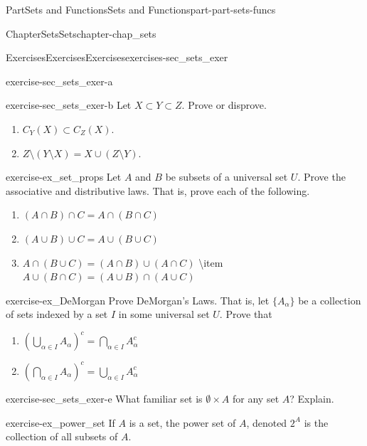 \documentclass[oneside,10pt,]{book}
\numberwithin{equation}{chapter}
\begin{document}
\begin{partptx}{Part}{Sets and Functions}{}{Sets and Functions}{}{}{part-part-sets-funcs}
\begin{chapterptx}{Chapter}{Sets}{}{Sets}{}{}{chapter-chap_sets}
\begin{exercises-section}{Exercises}{Exercises}{}{Exercises}{}{}{exercises-sec_sets_exer}
\begin{divisionexercise}{1}{}{}{exercise-sec_sets_exer-a}
\end{divisionexercise}%
\begin{divisionexercise}{2}{}{}{exercise-sec_sets_exer-b}%
Let \(X \subset Y \subset Z\). Prove or disprove.%
\begin{enumerate}[font=\bfseries,label=(\alph*),ref=\alph*]%
\item{}\(C_Y(X) \subset C_Z(X)\).%
\item{}\(Z \setminus (Y \setminus X) = X \cup (Z \setminus Y)\).%
\end{enumerate}%
\end{divisionexercise}%
\begin{divisionexercise}{3}{}{}{exercise-ex_set_props}%
Let \(A\) and \(B\) be subsets of a universal set \(U\). Prove the associative and distributive laws. That is, prove each of the following.%
\begin{enumerate}[font=\bfseries,label=(\alph*),ref=\alph*]%
\item{}\((A \cap B) \cap C = A \cap (B \cap C)\)%
\item{}\((A \cup B) \cup C = A \cup (B \cup C)\)%
\item{}\(A \cap (B \cup C) = (A \cap B) \cup (A \cap C)\) \textbackslash{}item\(A \cup (B \cap C) = (A \cup B) \cap (A \cup C)\)%
\end{enumerate}%
\end{divisionexercise}%
\begin{divisionexercise}{4}{}{}{exercise-ex_DeMorgan}%
Prove DeMorgan's Laws. That is, let \(\{A_{\alpha}\}\) be a collection of sets indexed by a set \(I\) in some universal set \(U\). Prove that%
\begin{enumerate}[font=\bfseries,label=(\alph*),ref=\alph*]%
\item{}\(\displaystyle \left(\bigcup_{\alpha \in I} A_{\alpha}\right)^c = \bigcap_{\alpha \in I} A_{\alpha}^c\)%
\item{}\(\displaystyle \left(\bigcap_{\alpha \in I} A_{\alpha}\right)^c = \bigcup_{\alpha \in I} A_{\alpha}^c\)%
\end{enumerate}%
\end{divisionexercise}%
\begin{divisionexercise}{5}{}{}{exercise-sec_sets_exer-e}%
What familiar set is \(\emptyset \times A\) for any set \(A\)? Explain.%
\end{divisionexercise}%
\begin{divisionexercise}{6}{}{}{exercise-ex_power_set}%
%
If \(A\) is a set, the power set of \(A\), denoted \(2^A\) is the collection of all subsets of \(A\).%

\end{divisionexercise}
\end{exercises-section}
\end{chapterptx}
\end{partptx}
\end{document}

